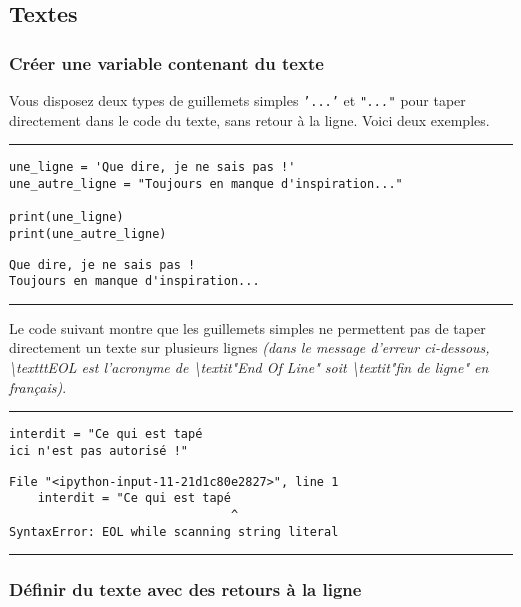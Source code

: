 \subsection{Textes}

\subsubsection{Créer une variable contenant du texte}

Vous disposez deux types de guillemets simples \texttt{'...'} et \texttt{\textit{"..."}} pour taper directement dans le code du texte, sans retour à la ligne. Voici deux exemples.


\bigskip
{\hrule height .5mm}
\begin{verbatim}
une_ligne = 'Que dire, je ne sais pas !'
une_autre_ligne = "Toujours en manque d'inspiration..."

print(une_ligne)
print(une_autre_ligne)
\end{verbatim}
 \color{ForestGreen}
\vspace{-1.5em}
\begin{verbatim}
Que dire, je ne sais pas !
Toujours en manque d'inspiration...
\end{verbatim} \color{Black}
{\hrule height .5mm}
\bigskip


Le code suivant montre que les guillemets simples ne permettent pas de taper directement un texte sur plusieurs lignes \textit{\textit{(dans le message d'erreur ci-dessous, \textbackslash{}texttt{EOL} est l'acronyme de \textbackslash{}textit{"End Of Line"} soit \textbackslash{}textit{"fin de ligne"} en français)}}.


\bigskip
{\hrule height .5mm}
\begin{verbatim}
interdit = "Ce qui est tapé
ici n'est pas autorisé !"
\end{verbatim}
 \color{ForestGreen}
\vspace{-1.5em}
\begin{verbatim}
File "<ipython-input-11-21d1c80e2827>", line 1
    interdit = "Ce qui est tapé
                               ^
SyntaxError: EOL while scanning string literal
\end{verbatim} \color{Black}
{\hrule height .5mm}
\bigskip


\subsubsection{Définir du texte avec des retours à la ligne}

